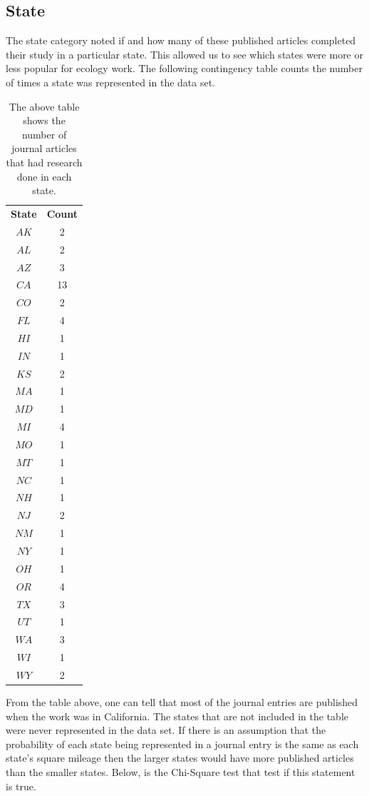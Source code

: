 \documentclass[12pt, letterpaper]{article}
\begin{document}
\subsection{State}
The state category noted if and how many of these published articles completed their study in a particular state. This allowed us to see which states were more or less popular for ecology work. The following contingency table counts the number of times a state was represented in the data set. 
\begin{table}[h]
\begin{center}
\begin{tabular}{|c|c|}
\textbf{State} & \textbf{Count}\\
$AK$ & 2\\
$AL$ &  2\\
$AZ$ &  3\\
$CA$ & 13\\
$CO$ & 2\\
$FL$ & 4\\
$HI$ & 1\\
$IN$ & 1\\
$KS$ & 2\\
$MA$ & 1\\
$MD$ &  1\\
$MI$ &  4\\
$MO$ & 1\\
$MT$ & 1\\
$NC$ & 1\\
$NH$ & 1\\
$NJ$ & 2\\
$NM$ & 1\\
$NY$ & 1\\
$OH$ &  1\\
$OR$ &  4\\
$TX$ & 3\\
$UT$ & 1\\
$WA$ & 3\\
$WI$ & 1\\
$WY$ & 2\\
\end{tabular}
\end{center}
\label{fig: State Contingency Table}
\caption{The above table shows the number of journal articles that had research done in each state.}
\end{table}

From the table above, one can tell that most of the journal entries are published when the work was in California. The states that are not included in the table were never represented in the data set. 
If there is an assumption that the probability of each state being represented in a journal entry is the same as each state's square mileage then the larger states would have more published articles than the smaller states. Below, is the Chi-Square test that test if this statement is true. 
\end{document}
